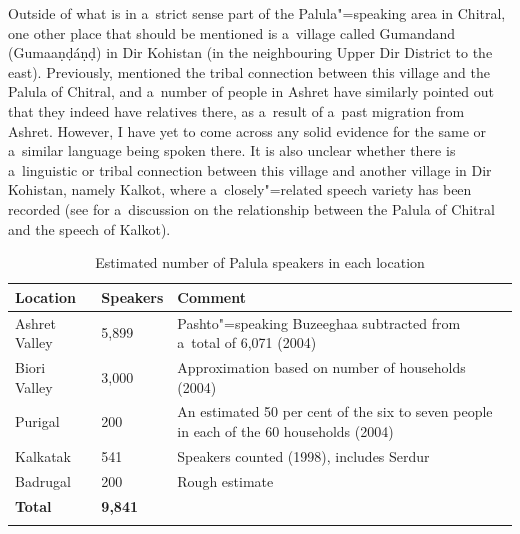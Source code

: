 Outside of what is in a~strict sense part of the Palula"=speaking area in Chitral, one other place
that should be mentioned is a~village called Gumandand (Gumaaṇḍáṇḍ) in Dir Kohistan (in the
neighbouring Upper Dir District to the east). Previously, \citet[9]{morgenstierne1941} mentioned the
tribal connection between this village and the Palula of Chitral, and a~number of people in Ashret
have similarly pointed out that they indeed have relatives there, as a~result of a~past migration
from Ashret. However, I have yet to come across any solid evidence for the same or a~similar
language being spoken there. It is also unclear whether there is a~linguistic or tribal connection
between this village and another village in Dir Kohistan, namely Kalkot, where a~closely"=related
speech variety has been recorded (see  for a~discussion on the
relationship between the Palula of Chitral and the speech of Kalkot).


\begin{table}
\caption{Estimated number of Palula speakers in each location}
\begin{tabularx}{\textwidth}{ l l Q }
\lsptoprule
Location &
Speakers &
Comment\\\hline
Ashret Valley &
5,899 &
Pashto"=speaking Buzeeghaa subtracted from a~total of 6,071 (2004)\\
Biori Valley &
3,000 &
Approximation based on number of households (2004)\\
Purigal &
\phantom{9}200 &
An estimated 50 per cent of the six to seven people in each of the 60 households (2004)\\
Kalkatak &
\phantom{9}541 &
Speakers counted (1998), includes Serdur\\
Badrugal &
\phantom{9}200 &
Rough estimate\\
\textbf{Total} &
\textbf{9,841} &
\\\lspbottomrule
\end{tabularx}
\label{tab:1-1}
\end{table}


